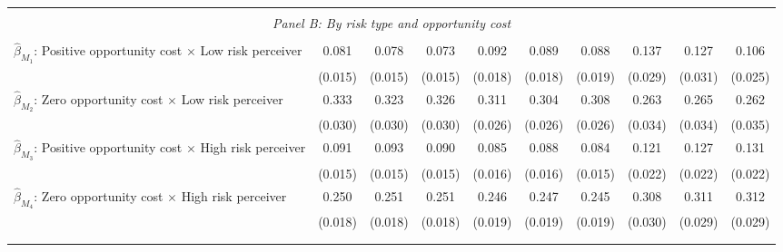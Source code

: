 \begin{tabular}{l*{9}{c}}
\hline \\[-1ex] \multicolumn{10}{c}{\textit{Panel B: By risk type and opportunity cost}} \\\\[-1ex]
$\hat\beta_{M_1}$: Positive opportunity cost $\times$ Low risk perceiver&       0.081\sym{***}&       0.078\sym{***}&       0.073\sym{***}&       0.092\sym{***}&       0.089\sym{***}&       0.088\sym{***}&       0.137\sym{***}&       0.127\sym{***}&       0.106\sym{***}\\
                    &     (0.015)         &     (0.015)         &     (0.015)         &     (0.018)         &     (0.018)         &     (0.019)         &     (0.029)         &     (0.031)         &     (0.025)         \\
[1em]
$\hat\beta_{M_2}$: Zero opportunity cost $\times$ Low risk perceiver&       0.333\sym{***}&       0.323\sym{***}&       0.326\sym{***}&       0.311\sym{***}&       0.304\sym{***}&       0.308\sym{***}&       0.263\sym{***}&       0.265\sym{***}&       0.262\sym{***}\\
                    &     (0.030)         &     (0.030)         &     (0.030)         &     (0.026)         &     (0.026)         &     (0.026)         &     (0.034)         &     (0.034)         &     (0.035)         \\
[1em]
$\hat\beta_{M_3}$: Positive opportunity cost $\times$ High risk perceiver&       0.091\sym{***}&       0.093\sym{***}&       0.090\sym{***}&       0.085\sym{***}&       0.088\sym{***}&       0.084\sym{***}&       0.121\sym{***}&       0.127\sym{***}&       0.131\sym{***}\\
                    &     (0.015)         &     (0.015)         &     (0.015)         &     (0.016)         &     (0.016)         &     (0.015)         &     (0.022)         &     (0.022)         &     (0.022)         \\
[1em]
$\hat\beta_{M_4}$: Zero opportunity cost $\times$ High risk perceiver&       0.250\sym{***}&       0.251\sym{***}&       0.251\sym{***}&       0.246\sym{***}&       0.247\sym{***}&       0.245\sym{***}&       0.308\sym{***}&       0.311\sym{***}&       0.312\sym{***}\\
                    &     (0.018)         &     (0.018)         &     (0.018)         &     (0.019)         &     (0.019)         &     (0.019)         &     (0.030)         &     (0.029)         &     (0.029)         \\
\\[-1.8ex] \hline \\[-1.8ex]  

\end{tabular}
